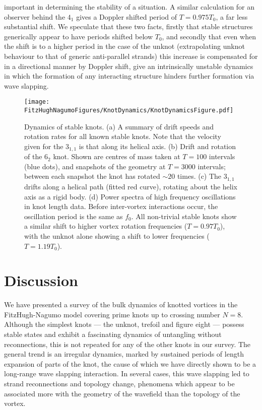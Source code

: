 important in determining the stability of a situation. A similar calculation for an observer behind the $4_1$ gives a Doppler shifted period of $T=0.975T_0$, a far less substantial shift. We speculate that these two facts, firstly that stable structures generically appear to have periods shifted below $T_0$, and secondly that even when the shift is to a higher period in the case of the unknot (extrapolating unknot behaviour to that of generic anti-parallel strands) this increase is compensated for in a directional manner by Doppler shift, give an intrinsically unstable dynamics in which the formation of any interacting structure hinders further formation via wave slapping.

\begin{figure}[htbp]
    \texttt{[image: \\FitzHughNagumoFigures/KnotDynamics/KnotDynamicsFigure.pdf]}
    \caption[Dynamics of stable knots.]{Dynamics of stable knots. (a) A summary of drift speeds and rotation rates for all known stable knots. Note that the velocity given for the $3_{1,1}$ is that along its helical axis. (b) Drift and rotation of the $6_2$ knot. Shown are centres of mass taken at $T=100$ intervals (blue dots), and snapshots of the geometry at $T=3000$ intervals; between each snapshot the knot has rotated $\sim 20$ times. (c) The $3_{1,1}$ drifts along a helical path (fitted red curve), rotating about the helix axis as a rigid body. (d) Power spectra of high frequency oscillations in knot length data. Before inter-vortex interactions occur, the oscillation period is the same as ${f_0}$. All non-trivial stable knots show a similar shift to higher vortex rotation frequencies ($T=0.97T_0$), with the unknot alone showing a shift to lower frequencies ($T=1.19T_0$).}
\label{fig:KnotDynamics}
\end{figure}
\section{\label{sec:Discussion}Discussion}

We have presented a survey of the bulk dynamics of knotted vortices in the FitzHugh-Nagumo model covering prime knots up to crossing number $N=8$. Although the simplest knots --- the unknot, trefoil and figure eight --- possess stable states and exhibit a fascinating dynamics of untangling without reconnections, this is not repeated for any of the other knots in our survey. The general trend is an irregular dynamics, marked by sustained periods of length expansion of parts of the knot, the cause of which we have directly shown to be a long-range wave slapping interaction. In several cases, this wave slapping led to strand reconnections and topology change, phenomena which appear to be associated more with the geometry of the wavefield than the topology of the vortex. 

